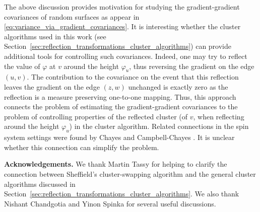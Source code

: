 \documentclass[english]{article}
\theoremstyle{plain}
\theoremstyle{plain}
\begin{document}
The above discussion provides motivation for studying the gradient-gradient covariances of random surfaces as appear in \eqref{eq:variance_via_gradient_covariances}. It is interesting whether the cluster algorithms used in this work (see Section~\ref{sec:reflection_transformations_cluster_algorithms}) can provide additional tools for controlling such covariances. Indeed, one may try to
reflect the value of $\varphi$ at $v$ around the height
$\varphi_u$, thus reversing the gradient on the edge $(u, v)$. The contribution to the covariance on the event that this reflection leaves the gradient on the edge $(z,w)$ unchanged is exactly zero as the reflection is a measure preserving one-to-one mapping. Thus, this approach connects the problem of estimating the gradient-gradient covariances to the problem of controlling properties of the reflected cluster (of $v$, when reflecting around the height $\varphi_u$) in the cluster algorithm. Related connections in the spin system settings were found by Chayes \cite{chayes1998discontinuity} and Campbell-Chayes \cite{campbell1998isotropic}. It is unclear whether this connection can simplify the problem.

\medskip
{\bf Acknowledgements.} We thank Martin Tassy for helping to clarify the connection between Sheffield's cluster-swapping algorithm and the general cluster algorithms discussed in Section~\ref{sec:reflection_transformations_cluster_algorithms}. We also thank Nishant Chandgotia and Yinon Spinka for several useful discussions.



\end{document}
